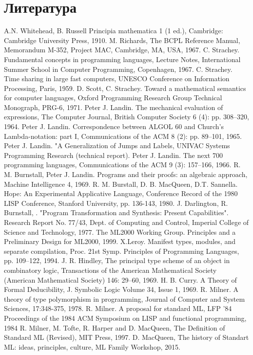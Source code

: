 \documentclass[14pt]{matmex-diploma-custom}
\begin{document}
\section{Литература}
\begin{thebibliography}{9}
    A.N. Whitehead, B. Russell Principia mathematica 1 (1 ed.), Cambridge: Cambridge University Press, 1910.
    M. Richards, The BCPL Reference Manual, Memorandum M-352, Project MAC, Cambridge, MA, USA, 1967.
    C. Strachey. Fundamental concepts in programming languages, Lecture Notes, International Summer School in Computer Programming, Copenhagen, 1967.
    C. Strachey. Time sharing in large fast computers, UNESCO Conference on Information Processing, Paris, 1959. 
    D. Scott, C. Strachey. Toward a mathematical semantics for computer languages, Oxford Programming Research Group Technical Monograph, PRG-6, 1971.
    Peter J. Landin. The mechanical evaluation of expressions, The Computer Journal, British Computer Society 6 (4): pp. 308–320, 1964.
    Peter J. Landin. Correspondence between ALGOL 60 and Church's Lambda-notation: part I, Communications of the ACM 8 (2): pp. 89–101, 1965.
    Peter J. Landin. "A Generalization of Jumps and Labels, UNIVAC Systems Programming Research (technical report).
    Peter J. Landin. The next 700 programming languages, Communications of the ACM 9 (3): 157–166, 1966.
    R. M. Burnstall, Peter J. Landin. Programs and their proofs: an algebraic approach, Machine Intelligence 4, 1969.
    R. M. Burstall, D. B. MacQueen, D.T. Sannella. Hope: An Experimental Applicative Language, Conference Record of the 1980 LISP Conference, Stanford University, pp. 136-143, 1980.
    J. Darlington, R. Burnstall, . "Program Transformation and Synthesis: Present Capabilities". Research Report No. 77/43, Dept. of Computing and Control, Imperial College of Science and Technology, 1977.
     The ML2000 Working Group. Principles and a Preliminary Design for ML2000, 1999.
     X.Leroy. Manifest types, modules, and separate compilation, Proc. 21st Symp. Principles of Programming Languages, pp. 109–122, 1994.
     J. R. Hindley, The principal type scheme of an object in combinatory logic, Transactions of the American Mathematical Society (American Mathematical Society) 146: 29–60, 1969.
     H. B. Curry. A Theory of Formal Deducibility, J. Symbolic Logic Volume 34, Issue 1, 1969.
     R. Milner. A theory of type polymorphism in programming, Journal of Computer and System Sciences, 17:348-375, 1978.
     R. Milner. A proposal for standard ML, LFP '84 Proceedings of the 1984 ACM Symposium on LISP and functional programming, 1984
     R. Milner, M. Tofte, R. Harper and D. MacQueen, The Definition of Standard ML (Revised), MIT Press, 1997.
     D. MacQueen, The history of Standart ML: ideas, principles, culture, ML Family Workshop, 2015.
\end{thebibliography}
\end{document}
